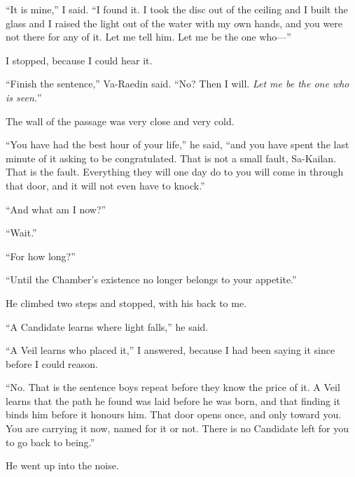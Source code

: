 ``It is mine,'' I said. ``I found it. I took the disc out of the ceiling and I built the glass and I raised the light out of the water with my own hands, and you were not there for any of it. Let me tell him. Let me be the one who---''\par

I stopped, because I could hear it.\par

``Finish the sentence,'' Va-Raedin said. ``No? Then I will. \textit{Let me be the one who is seen.}''\par

The wall of the passage was very close and very cold.\par

``You have had the best hour of your life,'' he said, ``and you have spent the last minute of it asking to be congratulated. That is not a small fault, Sa-Kailan. That is the fault. Everything they will one day do to you will come in through that door, and it will not even have to knock.''\par

``And what am I now?''\par

``Wait.''\par

``For how long?''\par

``Until the Chamber's existence no longer belongs to your appetite.''\par

He climbed two steps and stopped, with his back to me.\par

``A Candidate learns where light falls,'' he said.\par

``A Veil learns who placed it,'' I answered, because I had been saying it since before I could reason.\par

``No. That is the sentence boys repeat before they know the price of it. A Veil learns that the path he found was laid before he was born, and that finding it binds him before it honours him. That door opens once, and only toward you. You are carrying it now, named for it or not. There is no Candidate left for you to go back to being.''\par

He went up into the noise.\par

